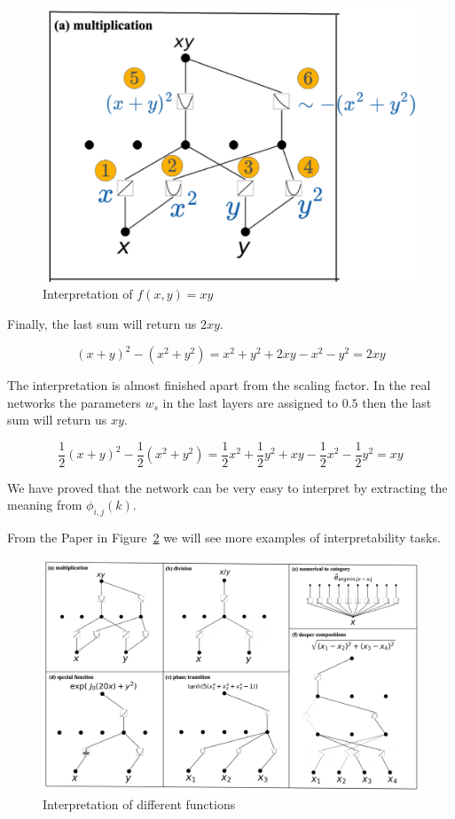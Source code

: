 \begin{figure}[H]
    \centering
    \includegraphics[width=0.5\linewidth]{LATEX//Images/interpr.png}
    \caption{Interpretation of $f(x,y)=xy$}
    \label{fig:interp}
\end{figure}

Finally, the last sum will return us $2xy$.

$$(x+y)^2 - (x^2+y^2) = x^2+y^2 +2xy - x^2 -y^2 = 2xy   $$

The interpretation is almost finished apart from the scaling factor. In the real networks the parameters $w_s$ in the last layers are assigned to $0.5$ then the last sum will return us $xy$.

$$\frac{1}{2}(x+y)^2 - \frac{1}{2}(x^2+y^2) = \frac{1}{2}x^2+\frac{1}{2}y^2 +xy - \frac{1}{2}x^2 - \frac{1}{2}y^2 = xy   $$ 

We have proved that the network can be very easy to interpret by extracting the meaning from $\phi_{i,j}(k)$.

From the Paper \cite{KAN} in Figure~\ref{fig:interp2} we will see more examples of interpretability tasks.

\begin{figure}[H]
    \centering
    \includegraphics[width=0.8\linewidth]{LATEX//Images/interpr2.png}
    \caption{Interpretation of different functions}
    \label{fig:interp2}
\end{figure}